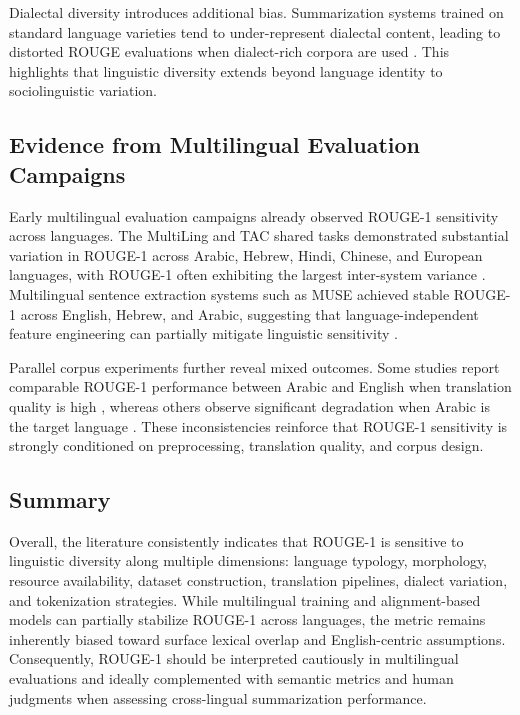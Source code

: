 Dialectal diversity introduces additional bias. Summarization systems trained on standard language varieties tend to under-represent dialectal content, leading to distorted ROUGE evaluations when dialect-rich corpora are used \citep{keswani2021dialect}. This highlights that linguistic diversity extends beyond language identity to sociolinguistic variation.

\subsection{Evidence from Multilingual Evaluation Campaigns}

Early multilingual evaluation campaigns already observed ROUGE-1 sensitivity across languages. The MultiLing and TAC shared tasks demonstrated substantial variation in ROUGE-1 across Arabic, Hebrew, Hindi, Chinese, and European languages, with ROUGE-1 often exhibiting the largest inter-system variance \citep{kubina2013multiling, giannakopoulos2013multiling}. Multilingual sentence extraction systems such as MUSE achieved stable ROUGE-1 across English, Hebrew, and Arabic, suggesting that language-independent feature engineering can partially mitigate linguistic sensitivity \citep{litvak2011muse}.

Parallel corpus experiments further reveal mixed outcomes. Some studies report comparable ROUGE-1 performance between Arabic and English when translation quality is high \citep{elhaj2011arabic}, whereas others observe significant degradation when Arabic is the target language \citep{oufaida2014minimum}. These inconsistencies reinforce that ROUGE-1 sensitivity is strongly conditioned on preprocessing, translation quality, and corpus design.

\subsection{Summary}

Overall, the literature consistently indicates that ROUGE-1 is sensitive to linguistic diversity along multiple dimensions: language typology, morphology, resource availability, dataset construction, translation pipelines, dialect variation, and tokenization strategies. While multilingual training and alignment-based models can partially stabilize ROUGE-1 across languages, the metric remains inherently biased toward surface lexical overlap and English-centric assumptions. Consequently, ROUGE-1 should be interpreted cautiously in multilingual evaluations and ideally complemented with semantic metrics and human judgments when assessing cross-lingual summarization performance.
